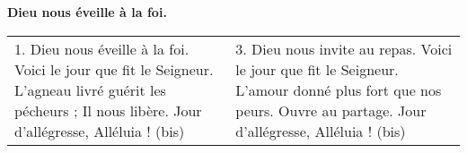 \textbf{Dieu nous éveille à la foi.}

\begin{tabular}{p{} p{}}
1.
Dieu nous éveille à la foi. \newline
Voici le jour que fit le Seigneur. \newline
L'agneau livré guérit les pécheurs ; \newline
Il nous libère. \newline
Jour d'allégresse, Alléluia ! (bis)
&
3.
Dieu nous invite au repas. \newline
Voici le jour que fit le Seigneur. \newline
L'amour donné plus fort que nos peurs. \newline
Ouvre au partage. \newline
Jour d'allégresse, Alléluia ! (bis)
\end{tabular}
